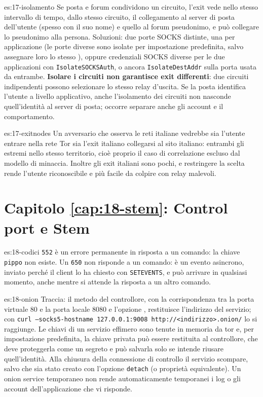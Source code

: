 \begin{soluzione}{es:17-isolamento}
Se posta e forum condividono un circuito, l'exit vede nello stesso intervallo di tempo, dallo stesso circuito, il collegamento al server di posta dell'utente (spesso con il suo nome) e quello al forum pseudonimo, e può collegare lo pseudonimo alla persona. Soluzioni: due porte SOCKS distinte, una per applicazione (le porte diverse sono isolate per impostazione predefinita, salvo assegnare loro lo stesso ), oppure credenziali SOCKS diverse per le due applicazioni con \texttt{IsolateSOCKSAuth}, o ancora \texttt{IsolateDestAddr} sulla porta usata da entrambe. \textbf{Isolare i circuiti non garantisce exit differenti}: due circuiti indipendenti possono selezionare lo stesso relay d'uscita. Se la posta identifica l'utente a livello applicativo, anche l'isolamento dei circuiti non nasconde quell'identità al server di posta; occorre separare anche gli account e il comportamento.
\end{soluzione}

\begin{soluzione}{es:17-exitnodes}
Un avversario che osserva le reti italiane vedrebbe sia l'utente entrare nella rete Tor sia l'exit italiano collegarsi al sito italiano: entrambi gli estremi nello stesso territorio, cioè proprio il caso di correlazione escluso dal modello di minaccia. Inoltre gli exit italiani sono pochi, e restringere la scelta rende l'utente riconoscibile e più facile da colpire con relay malevoli.
\end{soluzione}

\section*{Capitolo \ref{cap:18-stem}: Control port e Stem}

\begin{soluzione}{es:18-codici}
\texttt{552} è un errore permanente in risposta a un comando: la chiave \texttt{pippo} non esiste. Un \texttt{650} non risponde a un comando: è un evento asincrono, inviato perché il client lo ha chiesto con \texttt{SETEVENTS}, e può arrivare in qualsiasi momento, anche mentre si attende la risposta a un altro comando.
\end{soluzione}

\begin{soluzione}{es:18-onion}
Traccia: il metodo  del controllore, con la corrispondenza tra la porta virtuale 80 e la porta locale 8080 e l'opzione , restituisce l'indirizzo del servizio; con \texttt{curl --socks5-hostname 127.0.0.1:9008 http://<indirizzo>.onion/} lo si raggiunge. Le chiavi di un servizio effimero sono tenute in memoria da tor e, per impostazione predefinita, la chiave privata può essere restituita al controllore, che deve proteggerla come un segreto e può salvarla solo se intende riusare quell'identità. Alla chiusura della connessione di controllo il servizio scompare, salvo che sia stato creato con l'opzione \texttt{detach} (o proprietà equivalente). Un onion service temporaneo non rende automaticamente temporanei i log o gli account dell'applicazione che vi risponde.
\end{soluzione}

